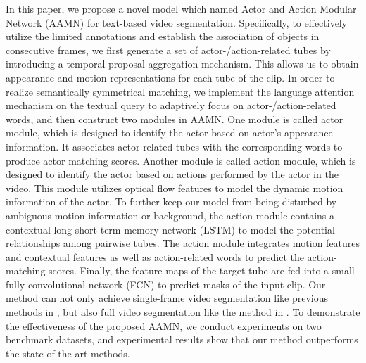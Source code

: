 \documentclass[journal]{IEEEtran}
\begin{document}
In this paper, we propose a novel model which named Actor and Action Modular Network (AAMN) for text-based video segmentation. Specifically, to effectively utilize the limited annotations and establish the association of objects in consecutive frames, we first generate a set of actor-/action-related tubes by introducing a temporal proposal aggregation mechanism. This allows us to obtain appearance and motion representations for each tube of the clip. In order to realize semantically symmetrical matching, we implement the language attention mechanism on the textual query to adaptively focus on actor-/action-related words, and then construct two modules in AAMN. One module is called actor module, which is designed to identify the actor based on actor's appearance information. It associates actor-related tubes with the corresponding words to produce actor matching scores. Another module is called action module, which is designed to identify the actor based on actions performed by the actor in the video. This module utilizes optical flow features to model the dynamic motion information of the actor. To further keep our model from being disturbed by ambiguous motion information or background, the action module contains a contextual long short-term memory network (LSTM) to model the potential relationships among pairwise tubes. The action module integrates motion features and contextual features as well as action-related words to predict the action-matching scores. Finally, the feature maps of the target tube are fed into a small fully convolutional network (FCN) \cite{long2015fully} to predict masks of the input clip. Our method can not only achieve single-frame video segmentation like previous methods in \cite{gavrilyuk2018actor,wang2019asymmetric,wang2020context}, but also full video segmentation like the method in \cite{mcintosh2018multi}. To demonstrate the effectiveness of the proposed AAMN, we conduct experiments on two benchmark datasets, and experimental results show that our method outperforms the state-of-the-art methods.
\end{document}
